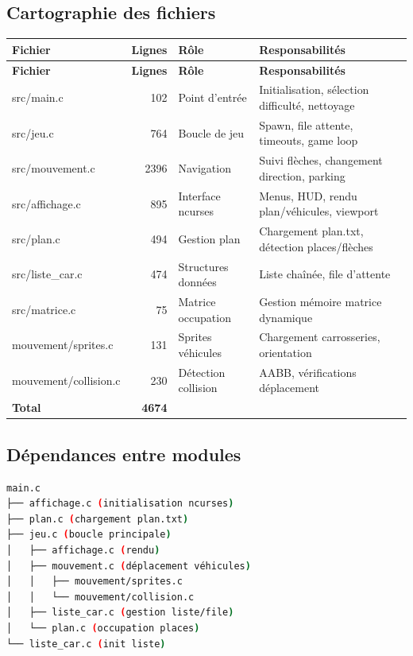 \documentclass[12pt,a4paper]{article}
\begin{document}
\subsection{Cartographie des fichiers}

\begin{longtable}{|l|r|p{4cm}|p{6cm}|}
\hline
\textbf{Fichier} & \textbf{Lignes} & \textbf{Rôle} & \textbf{Responsabilités} \\
\hline
\endfirsthead
\hline
\textbf{Fichier} & \textbf{Lignes} & \textbf{Rôle} & \textbf{Responsabilités} \\
\hline
\endhead
\hline
\endfoot
src/main.c & 102 & Point d'entrée & Initialisation, sélection difficulté, nettoyage \\
\hline
src/jeu.c & 764 & Boucle de jeu & Spawn, file attente, timeouts, game loop \\
\hline
src/mouvement.c & 2396 & Navigation & Suivi flèches, changement direction, parking \\
\hline
src/affichage.c & 895 & Interface ncurses & Menus, HUD, rendu plan/véhicules, viewport \\
\hline
src/plan.c & 494 & Gestion plan & Chargement plan.txt, détection places/flèches \\
\hline
src/liste\_car.c & 474 & Structures données & Liste chaînée, file d'attente \\
\hline
src/matrice.c & 75 & Matrice occupation & Gestion mémoire matrice dynamique \\
\hline
mouvement/sprites.c & 131 & Sprites véhicules & Chargement carrosseries, orientation \\
\hline
mouvement/collision.c & 230 & Détection collision & AABB, vérifications déplacement \\
\hline
\textbf{Total} & \textbf{4674} & & \\
\hline
\end{longtable}

\subsection{Dépendances entre modules}

\begin{lstlisting}[language=bash, frame=none, numbers=none]
main.c
├── affichage.c (initialisation ncurses)
├── plan.c (chargement plan.txt)
├── jeu.c (boucle principale)
│   ├── affichage.c (rendu)
│   ├── mouvement.c (déplacement véhicules)
│   │   ├── mouvement/sprites.c
│   │   └── mouvement/collision.c
│   ├── liste_car.c (gestion liste/file)
│   └── plan.c (occupation places)
└── liste_car.c (init liste)
\end{lstlisting}
\end{document}
